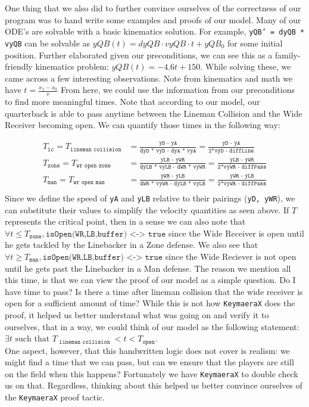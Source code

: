 \quad One thing that we also did to further convince ourselves of the correctness of our program was to hand write some examples and proofs of our model. Many of our ODE's are solvable with a basic kinematics solution. For example, \texttt{yQB' = dyQB * vyQB} can be solvable as $yQB(t) = dyQB \cdot vyQB \cdot t + yQB_0$ for some initial position. Further elaborated given our preconditions, we can see this as a family-friendly kinematics problem: $yQB(t) = -4.6t + 150$. While solving these, we came across a few interesting observations. Note from kinematics and math we have $t = \frac{x_f - x_0}{v}$ From here, we could use the information from our preconditions to find more meaningful times. Note that according to our model, our quarterback is able to pass anytime between the Lineman Collision and the Wide Receiver becoming open. We can quantify those times in the following way:

\begin{align*}
    T_\texttt{lc} = T_\texttt{lineman collision} &= \frac{\texttt{yD - yA}}{\texttt{dyD * vyD - dyA * vyA}} = \frac{\texttt{yD - yA}}{\texttt{2*vyD - diffLine}} \\
    T_\texttt{zone} = T_\texttt{wr open zone} &= \frac{\texttt{yLB - yWR}}{\texttt{dyLB * vyLB - dWR * vyWR}} = \frac{\texttt{yLB - yWR}}{\texttt{2*vyWR - diffPass}} \\ 
    T_\texttt{man} = T_\texttt{wr open man} &= \frac{\texttt{yWR - yLB}}{\texttt{dWR * vyWR - dyLB * vyLB}} = \frac{\texttt{yWR - yLB}}{\texttt{2*vyWR - diffPass}} \\
\end{align*}
Since we define the speed of \texttt{yA} and \texttt{yLB} relative to their pairings (\texttt{yD, yWR}), we can substitute their values to simplify the velocity quantities as seen above. If $T$ represents the critical point, then in a sense we can also note that $\forall t \le T_{\texttt{zone}}, \texttt{isOpen(WR,LB,buffer) <-> true}$ since the Wide Receiver is open until he gets tackled by the Linebacker in a Zone defense. We also see that $\forall t \ge T_{\texttt{man}}, \texttt{isOpen(WR,LB,buffer) <-> true}$ since the Wide Reciever is not open until he gets past the Linebacker in a Man defense. The reason we mention all this time, is that we can view the proof of our model as a simple question. Do I have time to pass? Is there a time after lineman collision that the wide receiver is open for a sufficient amount of time? While this is not how \texttt{KeymaeraX} does the proof, it helped us better understand what was going on and verify it to ourselves, that in a way, we could think of our model as the following statement: $\exists t \text{ such that } T_{\texttt{ lineman collision }} < t < T_{\texttt{open}}$. \\

One aspect, however, that this handwritten logic does not cover is realism: we might find a time that we can pass, but can we ensure that the players are still on the field when this happens? Fortunately we have \texttt{KeymaeraX} to double check us on that. Regardless, thinking about this helped us better convince ourselves of the \texttt{KeymaeraX} proof tactic. 